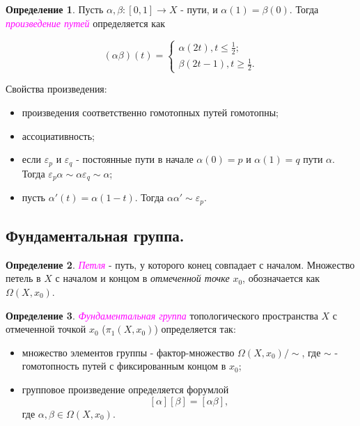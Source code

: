 \documentclass[a4paper,100pt]{article}
\theoremstyle{indented}
\theoremstyle{definition}
\newtheorem{defn}{Определение}
\theoremstyle{remark}
\DeclareMathOperator{\ra}{\rightarrow}
\begin{document}
\begin{defn}
    Пусть $\alpha, \beta: [0, 1] \ra X$ - пути, и $\alpha(1) = \beta(0)$. Тогда \textit{\textcolor{magenta}{\hypertarget{s111}{произведение путей}}} определяется как
    
    \begin{equation*}
        (\alpha \beta)(t) = 
        \begin{cases}
            \alpha(2t), t \leq \frac{1}{2}; \\ 
            \beta(2t-1), t \geq \frac{1}{2}. 
        \end{cases}
    \end{equation*}
\end{defn}

Свойства произведения:

\begin{itemize}
    \item произведения соответственно гомотопных путей гомотопны; 
    \item ассоциативность; 
    \item если $\varepsilon_p$ и $\varepsilon_q$ - постоянные пути в начале $\alpha(0)= p$ и $\alpha(1)= q$ пути $\alpha$. Тогда $\varepsilon_p \alpha \sim \alpha \varepsilon_q \sim \alpha$;
    \item пусть $\alpha'(t) = \alpha(1-t)$. Тогда $\alpha \alpha' \sim \varepsilon_p$.  
\end{itemize}

\subsection{Фундаментальная группа.}

\begin{defn}
    \textit{\textcolor{magenta}{\hypertarget{s112}{Петля}}} - путь, у которого конец совпадает с началом. Множество петель в $X$ с началом и концом в \textit{отмеченной точке} $x_0$, обозначается как $\Omega(X, x_0)$.
\end{defn}

\begin{defn}
    \textit{\textcolor{magenta}{\hypertarget{s113}{Фундаментальная группа}}} топологического пространства $X$ с отмеченной точкой $x_0$ ($\pi_1(X, x_0)$) определяется так: 

    \begin{itemize}
        \item множество элементов группы - фактор-множество $\Omega(X, x_0)/\sim$, где $\sim$ - гомотопность путей с фиксированным концом в $x_0$; 
        \item групповое произведение определяется форумлой 
        \[
            [\alpha][\beta]=[\alpha \beta],
        \]
        где $\alpha, \beta \in \Omega(X, x_0)$.
    \end{itemize}
\end{defn}
\end{document}
